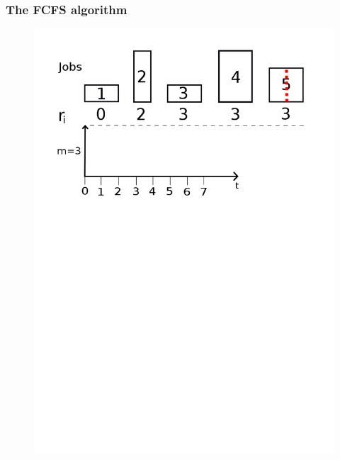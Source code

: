 \documentclass{beamer}
\begin{document}
\begin{frame}
  \frametitle{The FCFS algorithm}
  \begin{figure}[H]
          \centering
          \includegraphics[width=\textwidth]{FCFS0.png}
          \caption{}
          \label{fig:fcfs0_png}
  \end{figure}

\end{frame}
\end{document}
